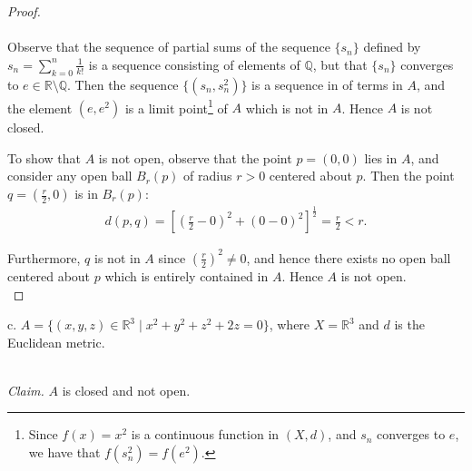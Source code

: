 \begin{proof}\ \\\\
    Observe that the sequence of partial sums of the sequence $\{s_n\}$ defined by 
    $s_n = \sum\limits_{k = 0}^{n}{\frac{1}{k!}}$ is a sequence consisting of elements of $\mathbb{Q}$, but that
    $\{s_n\}$ converges to $e \in \mathbb{R} \setminus \mathbb{Q}$. Then the sequence $\{(s_n, s_n^2)\}$ is a sequence in
    of terms in $A$, and the element $(e, e^2)$ is a limit point\footnote{
        Since $f(x) = x^2$ is a continuous function in $(X, d)$, and $s_n$ converges to $e$, we have that 
        $f(s_n^2) = f(e^2)$.
    } of $A$ which is not in $A$. Hence $A$ is not closed.

    To show that $A$ is not open, observe that the point $p = (0, 0)$ lies in $A$, and consider any open ball $B_r(p)$ 
    of radius $r > 0$ centered about $p$. Then the point $q = \left( \frac{r}{2}, 0 \right)$ is in $B_r(p)$:
    \begin{align*}
        d(p, q) = \left[ \left(\frac{r}{2} - 0 \right)^2 + (0 - 0)^2 \right]^\frac{1}{2}
                = \frac{r}{2}
                < r.
    \end{align*}

    Furthermore, $q$ is not in $A$ since $\left(\frac{r}{2}\right)^2 \neq 0$, and hence there exists no open ball 
    centered about $p$ which is entirely contained in $A$. Hence $A$ is not open.
    \ \\
\end{proof}

\pagebreak

c.  $A = \{(x, y, z) \in \mathbb{R}^3 \mid x^2 + y^2 + z^2 + 2z = 0 \}$, where $X = \mathbb{R}^3$ and $d$ is the 
    Euclidean metric.

\ \\
\emph{Claim.} $A$ is closed and not open.

